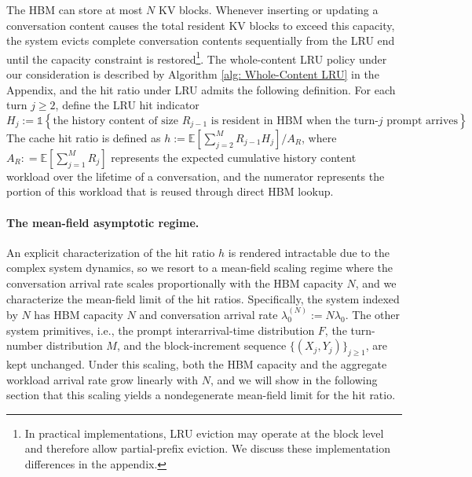 \documentclass{article}
\theoremstyle{definition}
\newcommand{\E}{\mathbb E}
\newcommand{\one}{\mathds{1}}
\begin{document}
The HBM can store at most $N$ KV blocks. Whenever inserting or updating a conversation content causes the total resident KV blocks to exceed this capacity, the system evicts complete conversation contents sequentially from the LRU end until the capacity constraint is restored\footnote{In practical implementations, LRU eviction may operate at the block level and therefore allow partial-prefix eviction. We discuss these implementation differences in the appendix.}. The whole-content LRU policy under our consideration is described by Algorithm \ref{alg: Whole-Content LRU} in the Appendix, and the hit ratio under LRU admits the following definition. 
    For each turn $j\geq 2$, define the LRU hit indicator
    \[H_{j} := \one \left\{ \text{the history content of size $R_{j-1}$ is resident in HBM when the turn-$j$ prompt arrives} \right\}.
    \]
    The cache hit ratio is defined as  $h  :=\E [\sum_{j=2}^{M}R_{j-1}H_{j}]/{A_R}$, where $A_R : =\E [\sum_{j=1}^{M} R_j]$ represents the expected cumulative history content workload over the lifetime of a conversation, and the numerator represents the portion of this workload that is reused through direct HBM lookup.


\vspace{-0.5em}
\vspace{-0.5em}

\paragraph{The mean-field asymptotic regime.}


An explicit characterization of the hit ratio $h$ is rendered intractable due to the complex system dynamics, so we resort to a mean-field scaling regime where the conversation arrival rate scales proportionally with the HBM capacity $N$, and we characterize the mean-field limit of the hit ratios.
Specifically, the system indexed by $N$ has HBM capacity $N$ and conversation arrival rate $\lambda_0^{(N)}:=N\lambda_0$. The other system primitives, i.e., the prompt interarrival-time distribution $F$, the turn-number distribution $M$, and the block-increment sequence $\{(X_j,Y_j)\}_{j\geq1}$, are kept unchanged. Under this scaling, both the HBM capacity and the aggregate workload arrival rate grow linearly with $N$, and we will show in the following section that this scaling yields a nondegenerate mean-field limit for the hit ratio.
\vspace{-0.5em}
\vspace{-0.5em}
\end{document}
